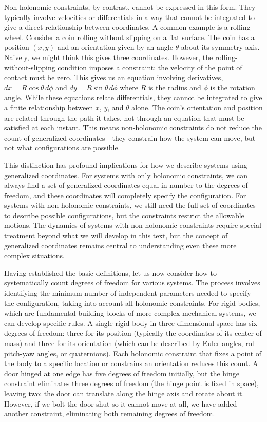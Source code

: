 Non-holonomic constraints, by contrast, cannot be expressed in this form. They typically involve velocities or differentials in a way that cannot be integrated to give a direct relationship between coordinates. A common example is a rolling wheel. Consider a coin rolling without slipping on a flat surface. The coin has a position $(x, y)$ and an orientation given by an angle $\theta$ about its symmetry axis. Naively, we might think this gives three coordinates. However, the rolling-without-slipping condition imposes a constraint: the velocity of the point of contact must be zero. This gives us an equation involving derivatives, $dx = R\cos\theta \, d\phi$ and $dy = R\sin\theta \, d\phi$ where $R$ is the radius and $\phi$ is the rotation angle. While these equations relate differentials, they cannot be integrated to give a finite relationship between $x$, $y$, and $\theta$ alone. The coin's orientation and position are related through the path it takes, not through an equation that must be satisfied at each instant. This means non-holonomic constraints do not reduce the count of generalized coordinates—they constrain how the system can move, but not what configurations are possible.

This distinction has profound implications for how we describe systems using generalized coordinates. For systems with only holonomic constraints, we can always find a set of generalized coordinates equal in number to the degrees of freedom, and these coordinates will completely specify the configuration. For systems with non-holonomic constraints, we still need the full set of coordinates to describe possible configurations, but the constraints restrict the allowable motions. The dynamics of systems with non-holonomic constraints require special treatment beyond what we will develop in this text, but the concept of generalized coordinates remains central to understanding even these more complex situations.

Having established the basic definitions, let us now consider how to systematically count degrees of freedom for various systems. The process involves identifying the minimum number of independent parameters needed to specify the configuration, taking into account all holonomic constraints. For rigid bodies, which are fundamental building blocks of more complex mechanical systems, we can develop specific rules. A single rigid body in three-dimensional space has six degrees of freedom: three for its position (typically the coordinates of its center of mass) and three for its orientation (which can be described by Euler angles, roll-pitch-yaw angles, or quaternions). Each holonomic constraint that fixes a point of the body to a specific location or constrains an orientation reduces this count. A door hinged at one edge has five degrees of freedom initially, but the hinge constraint eliminates three degrees of freedom (the hinge point is fixed in space), leaving two: the door can translate along the hinge axis and rotate about it. However, if we bolt the door shut so it cannot move at all, we have added another constraint, eliminating both remaining degrees of freedom.

